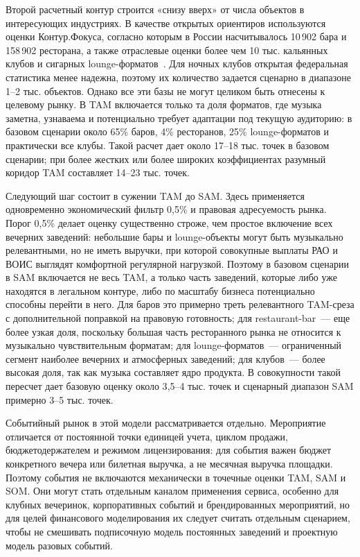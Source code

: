 Второй расчетный контур строится «снизу вверх» от числа объектов в интересующих индустриях. В качестве открытых ориентиров используются оценки Контур.Фокуса, согласно которым в России насчитывалось 10\,902 бара и 158\,902 ресторана, а также отраслевые оценки более чем 10 тыс. кальянных клубов и сигарных lounge-форматов~\cite{kontur_foodservice_2025,retail_hookah_lounge_2026}. Для ночных клубов открытая федеральная статистика менее надежна, поэтому их количество задается сценарно в диапазоне 1--2 тыс. объектов. Однако все эти базы не могут целиком быть отнесены к целевому рынку. В TAM включается только та доля форматов, где музыка заметна, узнаваема и потенциально требует адаптации под текущую аудиторию: в базовом сценарии около 65\% баров, 4\% ресторанов, 25\% lounge-форматов и практически все клубы. Такой расчет дает около 17--18 тыс. точек в базовом сценарии; при более жестких или более широких коэффициентах разумный коридор TAM составляет 14--23 тыс. точек.

Следующий шаг состоит в сужении TAM до SAM. Здесь применяется одновременно экономический фильтр 0{,}5\% и правовая адресуемость рынка. Порог 0{,}5\% делает оценку существенно строже, чем простое включение всех вечерних заведений: небольшие бары и lounge-объекты могут быть музыкально релевантными, но не иметь выручки, при которой совокупные выплаты РАО и ВОИС выглядят комфортной регулярной нагрузкой. Поэтому в базовом сценарии в SAM включается не весь TAM, а только часть заведений, которые либо уже находятся в легальном контуре, либо по масштабу бизнеса потенциально способны перейти в него. Для баров это примерно треть релевантного TAM-среза с дополнительной поправкой на правовую готовность; для restaurant-bar~--- еще более узкая доля, поскольку большая часть ресторанного рынка не относится к музыкально чувствительным форматам; для lounge-форматов~--- ограниченный сегмент наиболее вечерних и атмосферных заведений; для клубов~--- более высокая доля, так как музыка составляет ядро продукта. В совокупности такой пересчет дает базовую оценку около 3{,}5--4 тыс. точек и сценарный диапазон SAM примерно 3--5 тыс. точек.

Событийный рынок в этой модели рассматривается отдельно. Мероприятие отличается от постоянной точки единицей учета, циклом продажи, бюджетодержателем и режимом лицензирования: для события важен бюджет конкретного вечера или билетная выручка, а не месячная выручка площадки. Поэтому события не включаются механически в точечные оценки TAM, SAM и SOM. Они могут стать отдельным каналом применения сервиса, особенно для клубных вечеринок, корпоративных событий и брендированных мероприятий, но для целей финансового моделирования их следует считать отдельным сценарием, чтобы не смешивать подписочную модель постоянных заведений и проектную модель разовых событий.

